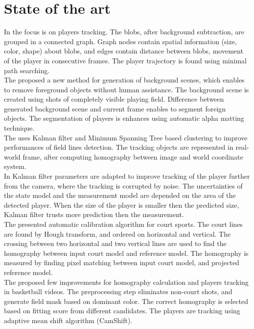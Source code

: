 \chapter{State of the art} \label{chap:State_of_the_art}

In \cite{Figueroa:2006dq} the focus is on players tracking. The blobs, after background subtraction,  are grouped  in a connected graph. Graph nodes contain spatial information (size, color, shape) about blobs, and edges contain distance between blobs, movement of the player in consecutive frames. The player trajectory is found using minimal path searching. \\

The \cite{Lai:2011gf} proposed a new method for generation of background scenes, which enables to remove foreground objects without human assistance. The background scene is created using shots of completely visible playing field. Difference between generated background scene and current frame enables to segment foreign objects. The segmentation of players is enhances using automatic alpha matting technique.\\

The \cite{Niu:2012dz} uses Kalman filter and Minimum Spanning Tree based clustering to improve performances of field lines detection. The tracking objects are represented in real-world frame, after computing homography between image and world coordinate system. \\

In \cite{Fang:2014uz} Kalman filter parameters are adapted to improve tracking of the player further from the camera, where the tracking is corrupted by noise. The uncertainties of the state model and the measurement model are depended on the area of the detected player. When the size of the player is smaller then the predicted size, Kalman filter trusts more prediction then the measurement.\\

The \cite{Farin:2004ix} presented automatic calibration algorithm for court sports. The court lines are found by Hough transform, and ordered on horizontal and vertical. The crossing between two horizontal and two vertical lines are used to find the homography between input court model and reference model. The homography is measured by finding pixel matching between input court model, and projected reference model.\\

The \cite{Hu:2011fu} proposed few improvements for homography calculation and players tracking in basketball videos. The preprocessing step eliminates non-court shots, and generate field mask based on dominant color. The correct homography is selected based on fitting score from different candidates. The players are tracking using adaptive mean shift algorithm (CamShift). \\

